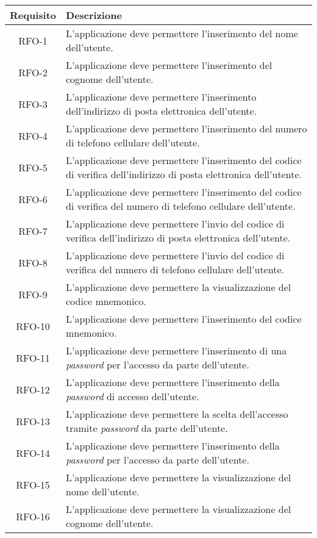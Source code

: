 \begin{longtable}{|c|p{10.5cm}|}
	\hline
	\rowcolor{gray}
	\textbf{Requisito} & \textbf{Descrizione} \\
	\hline
	RFO-1     & L'applicazione deve permettere l'inserimento del nome dell'utente. \\
	\hline
	RFO-2     & L'applicazione deve permettere l'inserimento del cognome dell'utente. \\
	\hline
	RFO-3     & L'applicazione deve permettere l'inserimento dell'indirizzo di posta elettronica dell'utente. \\
	\hline
	RFO-4     & L'applicazione deve permettere l'inserimento del numero di telefono cellulare dell'utente. \\
	\hline
	RFO-5     & L'applicazione deve permettere l'inserimento del codice di verifica dell'indirizzo di posta elettronica dell'utente. \\
	\hline
	RFO-6     & L'applicazione deve permettere l'inserimento del codice di verifica del numero di telefono cellulare dell'utente. \\
	\hline
	RFO-7     & L'applicazione deve permettere l'invio del codice di verifica dell'indirizzo di posta elettronica dell'utente. \\
	\hline
	RFO-8     & L'applicazione deve permettere l'invio del codice di verifica del numero di telefono cellulare dell'utente. \\
	\hline
	RFO-9     & L'applicazione deve permettere la visualizzazione del codice mnemonico. \\
	\hline
	RFO-10    & L'applicazione deve permettere l'inserimento del codice mnemonico. \\
	\hline
	RFO-11    & L'applicazione deve permettere l'inserimento di una \textit{password} per l'accesso da parte dell'utente. \\
	\hline
	RFO-12    & L'applicazione deve permettere l'inserimento della \textit{password} di accesso dell'utente. \\
	\hline
	RFO-13    & L'applicazione deve permettere la scelta dell'accesso tramite \textit{password} da parte dell'utente. \\
	\hline
	RFO-14    & L'applicazione deve permettere l'inserimento della \textit{password} per l'accesso da parte dell'utente. \\
	\hline
	RFO-15    & L'applicazione deve permettere la visualizzazione del nome dell'utente. \\
	\hline
	RFO-16    & L'applicazione deve permettere la visualizzazione del cognome dell'utente. \\

\end{longtable}
